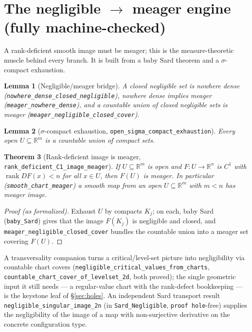 \documentclass[11pt]{article}
\theoremstyle{plain}
\newtheorem{theorem}{Theorem}[section]
\newtheorem{lemma}[theorem]{Lemma}
\theoremstyle{definition}
\theoremstyle{remark}
\newcommand{\RR}{\mathbb{R}}
\newcommand{\code}[1]{\texttt{\small #1}}
\DeclareMathOperator{\rank}{rank}
\begin{document}
\section{The negligible \texorpdfstring{$\to$}{->} meager engine
  (fully machine-checked)}\label{sec:engine}

A rank-deficient smooth image must be meager; this is the measure-theoretic
muscle behind every branch.  It is built from a baby Sard theorem and a
$\sigma$-compact exhaustion.

\begin{lemma}[Negligible/meager bridge]
A closed negligible set is nowhere dense (\code{nowhere\_dense\_closed\_negligible}),
nowhere dense implies meager (\code{meager\_nowhere\_dense}), and a countable
union of closed negligible sets is meager (\code{meager\_negligible\_closed\_cover}).
\end{lemma}

\begin{lemma}[$\sigma$-compact exhaustion, \code{open\_sigma\_compact\_exhaustion}]
Every open $U\subseteq\RR^m$ is a countable union of compact sets.
\end{lemma}

\begin{theorem}[Rank-deficient image is meager,
  \code{rank\_deficient\_C1\_image\_meager}]\label{thm:rankdef}
If $U\subseteq\RR^m$ is open and $F:U\to\RR^n$ is $C^1$ with
$\rank DF(x)<n$ for all $x\in U$, then $F(U)$ is meager.  In particular
(\code{smooth\_chart\_meager}) a smooth map from an open $U\subseteq\RR^m$ with
$m<n$ has meager image.
\end{theorem}

\begin{proof}[Proof (as formalized)]
Exhaust $U$ by compacts $K_j$; on each, baby Sard (\code{baby\_Sard}) gives
that the image $F(K_j)$ is negligible and closed, and
\code{meager\_negligible\_closed\_cover} bundles the countable union into a
meager set covering $F(U)$.
\end{proof}

A transversality companion turns a critical/level-set picture into negligibility
via countable chart covers (\code{negligible\_critical\_values\_from\_charts},
\code{countable\_chart\_cover\_of\_levelset\_2d}, both proved); the single
geometric input it still needs --- a regular-value chart with the rank-defect
bookkeeping --- is the keystone leaf of \S\ref{sec:holes}.  An independent Sard
transport result \code{negligible\_singular\_image\_2n} (in
\code{Sard\_Negligible}, \code{proof hole}-free) supplies the negligibility of the
image of a map with non-surjective derivative on the concrete configuration type.
\end{document}

